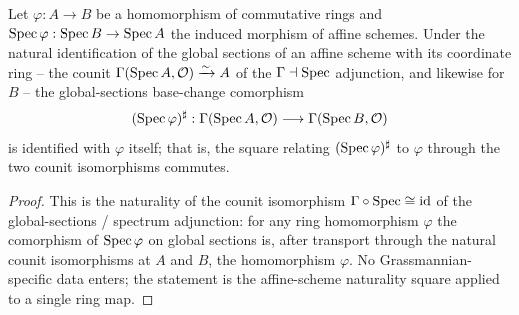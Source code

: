 \begin{lemma}\leanok
  \label{lem:gr_baseChange_bridge_gammaSpec}
  Let \(\varphi : A \to B\) be a homomorphism of commutative rings and
  \(\operatorname{Spec}\varphi : \operatorname{Spec} B \to \operatorname{Spec} A\) the induced morphism of affine schemes. Under the
  natural identification of the global sections of an affine scheme with its coordinate ring
  -- the counit \(\Gamma(\operatorname{Spec} A, \mathcal O) \xrightarrow{\sim} A\) of the
  \(\Gamma \dashv \operatorname{Spec}\) adjunction, and likewise for \(B\) -- the global-sections base-change
  comorphism
  \[
    (\operatorname{Spec}\varphi)^{\sharp} : \Gamma(\operatorname{Spec} A, \mathcal O) \longrightarrow \Gamma(\operatorname{Spec} B, \mathcal O)
  \]
  is identified with \(\varphi\) itself; that is, the square relating
  \((\operatorname{Spec}\varphi)^{\sharp}\) to \(\varphi\) through the two counit isomorphisms commutes.
\end{lemma}
\begin{proof}

  This is the naturality of the counit isomorphism \(\Gamma \circ \operatorname{Spec} \cong \mathrm{id}\) of
  the global-sections / spectrum adjunction: for any ring homomorphism \(\varphi\) the comorphism
  of \(\operatorname{Spec}\varphi\) on global sections is, after transport through the natural counit
  isomorphisms at \(A\) and \(B\), the homomorphism \(\varphi\). No Grassmannian-specific data
  enters; the statement is the affine-scheme naturality square applied to a single ring map.
\end{proof}

